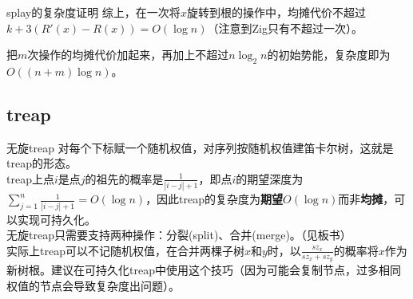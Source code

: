 \documentclass{beamer}
\begin{document}
\begin{frame}{splay的复杂度证明}
综上，在一次将$x$旋转到根的操作中，均摊代价不超过$k+3(R'(x)-R(x))=O(\log n)$（注意到Zig只有不超过一次）。

把$m$次操作的均摊代价加起来，再加上不超过$n\log_2n$的初始势能，复杂度即为$O((n+m)\log n)$。
\end{frame}
\subsection{treap}
\begin{frame}{无旋treap}
对每个下标赋一个随机权值，对序列按随机权值建笛卡尔树，这就是treap的形态。\\

treap上点$i$是点$j$的祖先的概率是$\frac{1}{|i-j|+1}$，即点$i$的期望深度为$\sum_{j=1}^n\frac{1}{|i-j|+1}=O(\log n)$，因此treap的复杂度为\textbf{期望}$O(\log n)$而非\textbf{均摊}，可以实现可持久化。\\

无旋treap只需要支持两种操作：分裂(split)、合并(merge)。（见板书）\\

实际上treap可以不记随机权值，在合并两棵子树$x$和$y$时，以$\frac{sz_x}{sz_x+sz_y}$的概率将$x$作为新树根。建议在可持久化treap中使用这个技巧（因为可能会复制节点，过多相同权值的节点会导致复杂度出问题）。
\end{frame}
\end{document}

